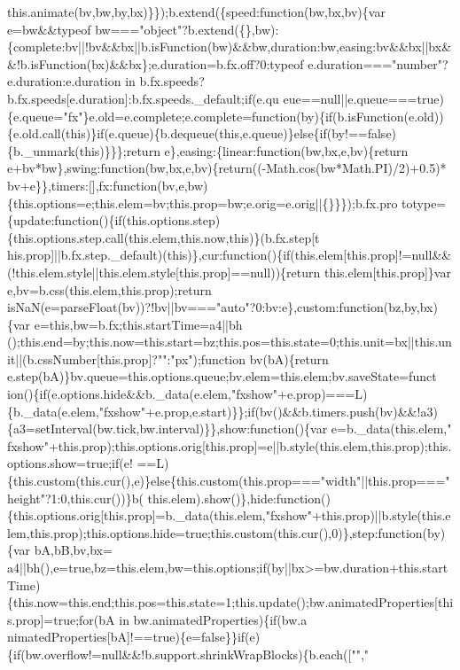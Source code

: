 \begin{DoxyCode}
{       this.animate(bv,bw,by,bx)\}\});b.extend(\{speed:function(bw,bx,bv)\{var e=bw&&typeof
       bw==="object"?b.extend(\{\},bw):\{complete:bv||!bv&&bx||b.isFunction(bw)&&bw,duration:bw,easing:bv&&bx||bx&&!b.isFunction(bx)&&bx\};e.duration=b.fx.off?0:typeof
       e.duration==="number"?e.duration:e.duration in
       b.fx.speeds?b.fx.speeds[e.duration]:b.fx.speeds.\_default;if(e.qu
      eue==null||e.queue===true)\{e.queue="fx"\}e.old=e.complete;e.complete=function(by)\{if(b.isFunction(e.old))\{e.old.call(this)\}if(e.queue)\{b.dequeue(this,e.queue)\}else\{if(by!==false)\{b.\_unmark(this)\}\}\};return
       e\},easing:\{linear:function(bw,bx,e,bv)\{return
       e+bv*bw\},swing:function(bw,bx,e,bv)\{return((-Math.cos(bw*Math.PI)/2)+0.5)*
      bv+e\}\},timers:[],fx:function(bv,e,bw)\{this.options=e;this.elem=bv;this.prop=bw;e.orig=e.orig||\{\}\}\});b.fx.pro
      totype=\{update:function()\{if(this.options.step)\{this.options.step.call(this.elem,this.now,this)\}(b.fx.step[t
      his.prop]||b.fx.step.\_default)(this)\},cur:function()\{if(this.elem[this.prop]!=null&&(!this.elem.style||this.elem.style[this.prop]==null))\{return this.elem[this.prop]\}var e,bv=b.css(this.elem,this.prop);return
       isNaN(e=parseFloat(bv))?!bv||bv==="auto"?0:bv:e\},custom:function(bz,by,bx)\{var
       e=this,bw=b.fx;this.startTime=a4||bh
      ();this.end=by;this.now=this.start=bz;this.pos=this.state=0;this.unit=bx||this.unit||(b.cssNumber[this.prop]?"":"px");function bv(bA)\{return
       e.step(bA)\}bv.queue=this.options.queue;bv.elem=this.elem;bv.saveState=funct
      ion()\{if(e.options.hide&&b.\_data(e.elem,"fxshow"+e.prop)===L)\{b.\_data(e.elem,"fxshow"+e.prop,e.start)\}\};if(bv()&&b.timers.push(bv)&&!a3)\{a3=setInterval(bw.tick,bw.interval)\}\},show:function()\{var
       e=b.\_data(this.elem,"
      fxshow"+this.prop);this.options.orig[this.prop]=e||b.style(this.elem,this.prop);this.options.show=true;if(e!
      ==L)\{this.custom(this.cur(),e)\}else\{this.custom(this.prop==="width"||this.prop==="height"?1:0,this.cur())\}b(
      this.elem).show()\},hide:function()\{this.options.orig[this.prop]=b.\_data(this.elem,"fxshow"+this.prop)||b.style(this.elem,this.prop);this.options.hide=true;this.custom(this.cur(),0)\},step:function(by)\{var
       bA,bB,bv,bx=
      a4||bh(),e=true,bz=this.elem,bw=this.options;if(by||bx>=bw.duration+this.startTime)\{this.now=this.end;this.pos=this.state=1;this.update();bw.animatedProperties[this.prop]=true;for(bA in
       bw.animatedProperties)\{if(bw.a
      nimatedProperties[bA]!==true)\{e=false\}\}if(e)\{if(bw.overflow!=null&&!b.support.shrinkWrapBlocks)\{b.each(["","
}
\end{DoxyCode}
